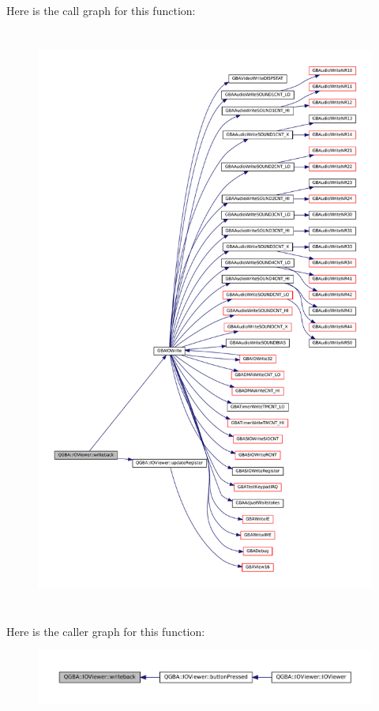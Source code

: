 Here is the call graph for this function\+:
\nopagebreak
\begin{figure}[H]
\begin{center}
\leavevmode
\includegraphics[height=550pt]{class_q_g_b_a_1_1_i_o_viewer_acff07815a227bbaa5b04fb85df8fa64a_cgraph}
\end{center}
\end{figure}
Here is the caller graph for this function\+:
\nopagebreak
\begin{figure}[H]
\begin{center}
\leavevmode
\includegraphics[width=350pt]{class_q_g_b_a_1_1_i_o_viewer_acff07815a227bbaa5b04fb85df8fa64a_icgraph}
\end{center}
\end{figure}


